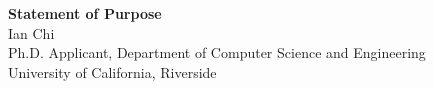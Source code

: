 \documentclass[11pt]{article}
\begin{document}
\begin{center}
    {\Large \textbf{Statement of Purpose}}\\[4pt]
    {\large Ian Chi}\\[2pt]
    Ph.D. Applicant, Department of Computer Science and Engineering\\
    University of California, Riverside
\end{center}

\vspace{1em}

\end{document}
